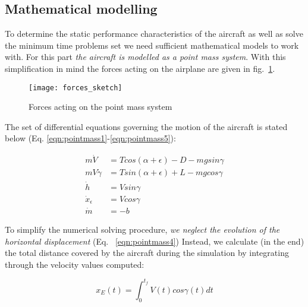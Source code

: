 \subsection{Mathematical modelling}

\noindent To determine the static performance characteristics of the
aircraft as well as solve the minimum time problems set we need sufficient
mathematical models to work with. For this part \textit{the aircraft is
modelled as a point mass system}. With this simplification in mind the forces
acting on the airplane are given in fig.~\ref{fig:forces_sketch}.

\begin{figure}[H]
    \centering
    \texttt{[image: forces\_sketch]}
    \caption{Forces acting on the point mass system}
    \label{fig:forces_sketch}
\end{figure}

\noindent The set of differential equations governing the motion of the aircraft is stated 
below (Eq. \ref{eqn:pointmass1}-\ref{eqn:pointmass5}):

\begin{align}
    m\dot{V}&= Tcos(\alpha + \epsilon) - D - mgsin\gamma  \label{eqn:pointmass1}\\
    mV\dot{\gamma}&= Tsin(\alpha + \epsilon) + L - mgcos\gamma \label{eqn:pointmass2}\\
    \dot{h} &= Vsin\gamma \label{eqn:pointmass3}\\
    \dot{x}_{\epsilon} &= Vcos\gamma \label{eqn:pointmass4}\\
    \dot{m} &= -b \label{eqn:pointmass5}
\end{align}

%
%
%
%
%
%
%
%
%
%


\noindent To simplify the numerical solving procedure, \textit{we neglect the evolution of 
the horizontal displacement} (Eq. ~\ref{eqn:pointmass4}) Instead, we calculate (in the end)
the total distance covered by the aircraft during the simulation by integrating through 
the velocity values computed:

\begin{equation}
    x_E(t) = \int_0^{t_f} \! V(t) cos\gamma(t) dt
    \label{eqn:integral_distance}
\end{equation}

